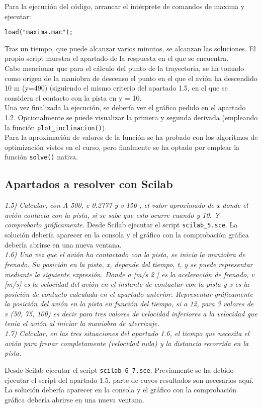 \documentclass[fleqn,10pt]{wlscirep}
\begin{document}
Para la ejecución del código, arrancar el intérprete de comandos de
maxima y ejecutar:

\begin{verbatim}
load("maxima.mac");
\end{verbatim}

Tras un tiempo, que puede alcanzar varios minutos, se alcanzan las
soluciones. El propio script muestra el apartado de la respuesta en el
que se encuentra.\\
Cabe mencionar que para el cálculo del punto de la trayectoria, se ha
tomado como origen de la maniobra de descenso el punto en el que el
avión ha descendido 10 m (y=490) (siguiendo el mismo criterio del
apartado 1.5, en el que se considera el contacto con la pista en y =
10.\\
Una vez finalizada la ejecución, se debería ver el gráfico pedido en el
apartado 1.2. Opcionalmente se puede visualizar la primera y segunda
derivada (empleando la función \texttt{plot\_inclinacion()}).\\
Para la aproximación de valores de la función se ha probado con los
algoritmos de optimización vistos en el curso, pero finalmente se ha
optado por emplear la función \texttt{solve()} nativa.

\subsection{Apartados a resolver con
Scilab}\label{apartados-a-resolver-con-scilab}

\emph{1.5) Calcular, con A 500, c 0.2777 y v 150 , el valor aproximado
de x donde el avión contacta con la pista, si se sabe que esto ocurre
cuando y 10. Y comprobarlo gráficamente.} Desde Scilab ejecutar el
script \texttt{scilab\_5.sce}. La solución debería aparecer en la
consola y el gráfico con la comprobación gráfica debería abrirse en una
nueva ventana.\\
\emph{1.6) Una vez que el avión ha contactado con la pista, se inicia la
maniobra de frenado. Su posición en la pista, x, depende del tiempo, t,
y se puede representar mediante la siguiente expresión. Donde a {[}m/s 2
{]} es la aceleración de frenado, v {[}m/s{]} es la velocidad del avión
en el instante de contactar con la pista y x es la posición de contacto
calculada en el apartado anterior. Representar gráficamente la posición
del avión en la pista en función del tiempo, si a 12, para 3 valores de
v (50, 75, 100) es decir para tres valores de velocidad inferiores a la
velocidad que tenía el avión al iniciar la maniobra de aterrizaje.\\
1.7) Calcular, en las tres situaciones del apartado 1.6, el tiempo que
necesita el avión para frenar completamente (velocidad nula) y la
distancia recorrida en la pista.}

Desde Scilab ejecutar el script \texttt{scilab\_6\_7.sce}. Previamente
se ha debido ejecutar el script del apartado 1.5, parte de cuyos
resultados son necesarios aquí.\\
La solución debería aparecer en la consola y el gráfico con la
comprobación gráfica debería abrirse en una nueva ventana.
\end{document}
